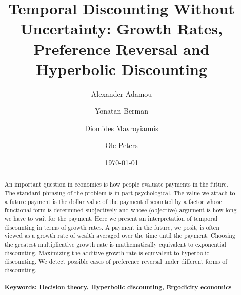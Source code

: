 \documentclass[11pt]{article}
\numberwithin{equation}{section}
\begin{document}
\begin{titlepage}
\title{Temporal Discounting Without Uncertainty: Growth Rates, Preference Reversal and Hyperbolic Discounting}
\author{Alexander Adamou \and Yonatan Berman \and Diomides Mavroyiannis \and Ole Peters}
\date{\today}
\maketitle
\begin{abstract}
\noindent An important question in economics is how people evaluate payments in the future. The standard phrasing of the problem is in part psychological. The value we attach to a future payment is the dollar value of the payment discounted by a factor whose functional form is determined subjectively and whose (objective) argument is how long we have to wait for the payment. Here we present an interpretation of temporal discounting in terms of growth rates. A payment in the future, we posit, is often viewed as a growth rate of wealth averaged over the time until the payment. Choosing the greatest multiplicative growth rate is mathematically equivalent to exponential discounting. Maximizing the additive growth rate is equivalent to hyperbolic discounting. We detect possible cases of preference reversal under different forms of discounting.
\\
\\
\noindent\textbf{Keywords: Decision theory, Hyperbolic discounting, Ergodicity economics}
\\

\bigskip
\end{abstract}
\setcounter{page}{0}
\thispagestyle{empty}
\end{titlepage}
\pagebreak \newpage
\end{document}
